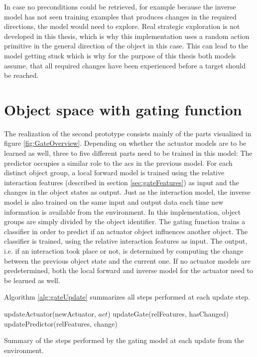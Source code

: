 In case no preconditions could be retrieved, for example because the inverse model has not seen training examples that produces changes in the required directions, the model would need to explore. Real strategic exploration is not developed in this thesis, which is why this implementation uses a random action primitive in the general direction of the object in this case. This can lead to the model getting stuck which is why for the purpose of this thesis both models assume, that all required changes have been experienced before a target should be reached.


\section{Object space with gating function \label{sec:gateRealization}}

The realization of the second prototype consists mainly of the parts visualized in figure \ref{fig:GateOverview}. 
Depending on whether the actuator models are to be learned as well, three to five different parts need to be trained in this model: The predictor occupies a similar role to the \glspl{ac} in the previous model. For each distinct object group, a local forward model is trained using the relative interaction features (described in section \ref{sec:gateFeatures}) as input and the changes in the object states as output. Just as the interaction model, the inverse model is also trained on the same input and output data each time new information is available from the environment. 
In this implementation, object groups are simply divided by the object identifier. 
The gating function trains a classifier in order to predict if an actuator object influences another object. The classifier is trained, using the relative interaction features as input. The output, i.e. if an interaction took place or not, is determined by computing the change between the previous object state and the current one.
If no actuator models are predetermined, both the local forward and inverse model for the actuator need to be learned as well.

Algorithm \ref{alg:gateUpdate} summarizes all steps performed at each update step.

\begin{algorithm}
\begin{algorithmic}[1]
	\Statex
	\State updateActuator(newActuator, $act$)
		\State updateGate(relFeatures, hasChanged)
			\State updatePredictor(relFeatures, change)
		\EndIf
	\EndFor
\end{algorithmic}
\caption{Summary of the steps performed by the gating model at each update from the environment.}
\label{alg:gateUpdate}
\end{algorithm}


